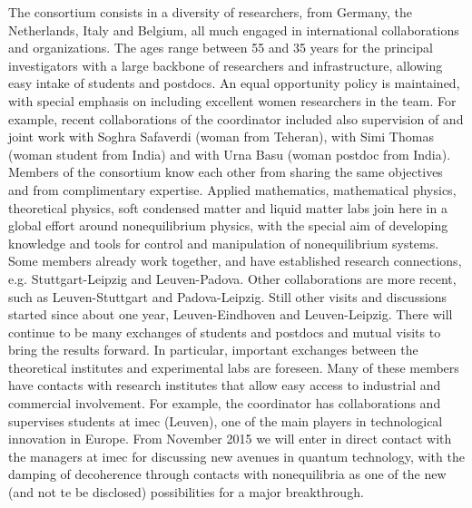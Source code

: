 The consortium consists in a diversity of researchers, from Germany, the
Netherlands, Italy and Belgium, all much engaged in international collaborations and
organizations.
%
The ages range between 55 and 35 years for the principal investigators with a large backbone
of researchers and infrastructure, allowing easy intake of students and postdocs. An equal
opportunity policy is maintained, with special emphasis on including excellent women
researchers in the team. For example, recent collaborations of the coordinator included also
supervision of and joint work with Soghra Safaverdi (woman from Teheran), with Simi Thomas
(woman student from India) and with Urna Basu (woman postdoc from India).  Members of the
consortium know each other from sharing the same objectives and from complimentary
expertise.
%
Applied mathematics, mathematical physics, theoretical physics, soft condensed matter and
liquid matter labs join here in a global effort around nonequilibrium physics, with the
special aim of developing knowledge and tools for control and manipulation of nonequilibrium
systems. Some members already work together, and have established research connections,
e.g. Stuttgart-Leipzig and Leuven-Padova.  Other collaborations are more
recent, such as Leuven-Stuttgart and Padova-Leipzig.  Still other visits and discussions
started since about one year, Leuven-Eindhoven and Leuven-Leipzig.
%
There will continue to be many exchanges of students and postdocs and mutual visits to bring
the results forward.  In particular, important exchanges between the theoretical institutes
and experimental labs are foreseen.  Many of these members have contacts with research
institutes that allow easy access to industrial and commercial involvement.  For example,
the coordinator has collaborations and supervises students at imec (Leuven), one of the main
players in technological innovation in Europe. From November 2015 we will enter in direct
contact with the managers at imec for discussing new avenues in quantum technology, with the
damping of decoherence through contacts with nonequilibria as one of the new (and not te be
disclosed) possibilities for a major breakthrough.


